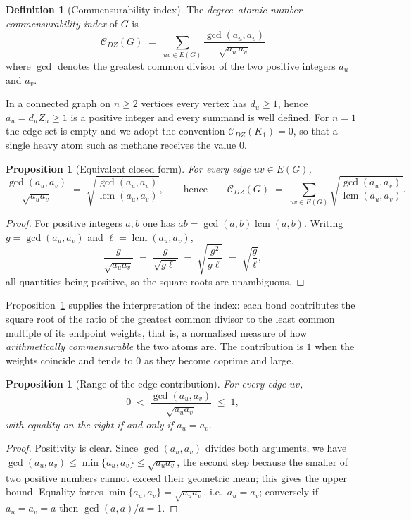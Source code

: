\documentclass[11pt,a4paper]{article}
\theoremstyle{plain}
\newtheorem{proposition}[theorem]{Proposition}
\theoremstyle{definition}
\newtheorem{definition}[theorem]{Definition}
\theoremstyle{remark}
\newcommand{\CDZ}{\mathcal{C}_{DZ}}
\newcommand{\gcdd}{\operatorname{gcd}}
\newcommand{\lcmm}{\operatorname{lcm}}
\begin{document}
\begin{definition}[Commensurability index]
\label{def:cdz}
The \emph{degree--atomic number commensurability index} of $G$ is
\[
  \boxed{\;
  \CDZ(G) \;=\; \sum_{uv\in E(G)} \frac{\gcdd(a_u,a_v)}{\sqrt{a_u\,a_v}}
  \;}
\]
where $\gcdd$ denotes the greatest common divisor of the two positive integers
$a_u$ and $a_v$.
\end{definition}

In a connected graph on $n\ge2$ vertices every vertex has $d_u\ge1$, hence
$a_u=d_uZ_u\ge1$ is a positive integer and every summand is well defined. For
$n=1$ the edge set is empty and we adopt the convention $\CDZ(K_1)=0$, so that a
single heavy atom such as methane receives the value $0$.

\begin{proposition}[Equivalent closed form]
\label{prop:lcm}
For every edge $uv\in E(G)$,
\[
  \frac{\gcdd(a_u,a_v)}{\sqrt{a_u a_v}}
  \;=\; \sqrt{\frac{\gcdd(a_u,a_v)}{\lcmm(a_u,a_v)}},
  \qquad\text{hence}\qquad
  \CDZ(G) \;=\; \sum_{uv\in E(G)}\sqrt{\frac{\gcdd(a_u,a_v)}{\lcmm(a_u,a_v)}} .
\]
\end{proposition}

\begin{proof}
For positive integers $a,b$ one has $ab=\gcdd(a,b)\lcmm(a,b)$. Writing
$g=\gcdd(a_u,a_v)$ and $\ell=\lcmm(a_u,a_v)$,
\[
  \frac{g}{\sqrt{a_ua_v}} \;=\; \frac{g}{\sqrt{g\ell}}
  \;=\; \sqrt{\frac{g^2}{g\ell}} \;=\; \sqrt{\frac{g}{\ell}},
\]
all quantities being positive, so the square roots are unambiguous.
\end{proof}

Proposition~\ref{prop:lcm} supplies the interpretation of the index: each bond
contributes the square root of the ratio of the greatest common divisor to the
least common multiple of its endpoint weights, that is, a normalised measure of
how \emph{arithmetically commensurable} the two atoms are. The contribution is
$1$ when the weights coincide and tends to $0$ as they become coprime and large.

\begin{proposition}[Range of the edge contribution]
\label{prop:range}
For every edge $uv$,
\[
  0 \;<\; \frac{\gcdd(a_u,a_v)}{\sqrt{a_ua_v}} \;\le\; 1,
\]
with equality on the right if and only if $a_u=a_v$.
\end{proposition}

\begin{proof}
Positivity is clear. Since $\gcdd(a_u,a_v)$ divides both arguments, we have
$\gcdd(a_u,a_v)\le\min\{a_u,a_v\}\le\sqrt{a_ua_v}$, the second step because the
smaller of two positive numbers cannot exceed their geometric mean; this gives
the upper bound. Equality forces
$\min\{a_u,a_v\}=\sqrt{a_ua_v}$, i.e.\ $a_u=a_v$; conversely if $a_u=a_v=a$ then
$\gcdd(a,a)/a=1$.
\end{proof}
\end{document}

